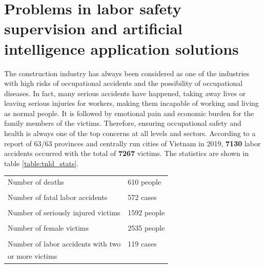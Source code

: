 \documentclass[conference]{IEEEtran}
\begin{document}
\section{Problems in labor safety supervision and artificial intelligence application solutions}
The construction industry has always been considered as one of the industries with high risks of occupational accidents and the possibility of occupational diseases. In fact, many serious accidents have happened, taking away lives or leaving serious injuries for workers, making them incapable of working and living as normal people. It is followed by emotional pain and economic burden for the family members of the victims. Therefore, ensuring occupational safety and health is always one of the top concerns at all levels and sectors. According to a report \cite{tnld:2019:gov} of 63/63 provinces and centrally run cities of Vietnam in 2019, \textbf{7130} labor accidents occurred with the total of \textbf{7267} victims. The statistics are shown in table \ref{table:tnld_stats}.
\begin{center}
  \begin{tabular} {l l}
  \toprule
  \midrule
  Number of deaths & 610 people\\
  \\
  Number of fatal labor accidents & 572 cases\\
  \\
  Number of seriously injured victims & 1592 people \\
  \\
  Number of female victims & 2535 people \\
  \\
  Number of labor accidents with two & 119 cases \\
  or more victims \\
  \bottomrule
  \end{tabular}
\end{center}
\end{document}
